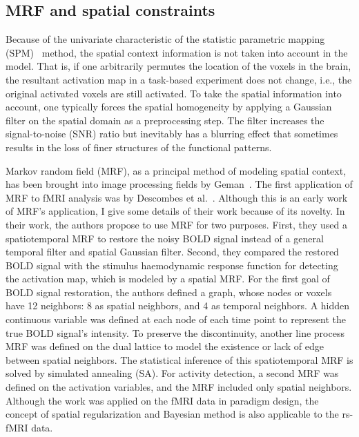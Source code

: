 \subsection{MRF and spatial constraints}

Because of the univariate characteristic of the statistic parametric mapping
(SPM)~\cite{friston2007statistical} method, the spatial context information is
not taken into account in the model. That is, if one arbitrarily permutes the
location of the voxels in the brain, the resultant activation map in a
task-based experiment does not change, i.e., the original activated voxels are
still activated. To take the spatial information into account, one typically
forces the spatial homogeneity by applying a Gaussian filter on the spatial
domain as a preprocessing step. The filter increases the signal-to-noise (SNR)
ratio but inevitably has a blurring effect that sometimes results in the loss of
finer structures of the functional patterns.

Markov random field (MRF), as a principal method of modeling spatial context,
 has been brought into image processing fields by
Geman~\cite{geman1984stochastic}. The first application of MRF to fMRI analysis
was by Descombes et al.~\cite{descombes_spatio-temporal_1998}. Although this is
an early work of MRF's application, I give some details of their work because of
its novelty. In their work, the authors propose to use MRF for two
purposes. First, they used a spatiotemporal MRF to restore the noisy BOLD
signal instead of a general temporal filter and spatial Gaussian filter. Second,
they compared the restored BOLD signal with the stimulus haemodynamic response
function for detecting the activation map, which is modeled by a spatial
MRF. For the first goal of BOLD signal restoration, the authors defined a graph,
whose nodes or voxels have 12 neighbors: 8 as spatial neighbors, and 4 as
temporal neighbors. A hidden continuous variable was defined at each node of
each time point to represent the true BOLD signal's intensity. To preserve the
discontinuity, another line process MRF was defined on the dual lattice to model
the existence or lack of edge between spatial neighbors. The statistical
inference of this spatiotemporal MRF is solved by simulated annealing (SA). For
activity detection, a second MRF was defined on the activation variables, and
the MRF included only spatial neighbors. Although the work was applied on the
fMRI data in paradigm design, the concept of spatial regularization and Bayesian
method is also applicable to the rs-fMRI data.

